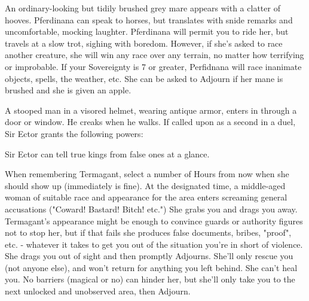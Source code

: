 
An ordinary-looking but tidily brushed grey mare appears with a clatter of hooves.  Pferdinana can speak to horses, but translates with snide remarks and uncomfortable, mocking laughter.  Pferdinana will permit you to ride her, but travels at a slow trot, sighing with boredom.  However, if she's asked to race another creature, she will win any race over any terrain, no matter how terrifying or improbable.  If your Sovereignty is 7 or greater, Perfidnana will race inanimate objects, spells, the weather, etc.  She can be asked to Adjourn if her mane is brushed and she is given an apple.


A stooped man in a visored helmet, wearing antique armor, enters in through a door or window.  He creaks when he walks.  If called upon as a second in a duel, Sir Ector grants the following powers:


Sir Ector can tell true kings from false ones at a glance.



When remembering Termagant, select a number of Hours from now when she should show up (immediately is fine).  At the designated time, a middle-aged woman of suitable race and appearance for the area enters screaming general accusations ("Coward!  Bastard!  Bitch!  etc.")  She grabs you and drags you away.  Termagant's appearance might be enough to convince guards or authority figures not to stop her, but if that fails she produces false documents, bribes, "proof", etc. - whatever it takes to get you out of the situation you're in short of violence.  She drags you out of sight and then promptly Adjourns.  She'll only rescue you (not anyone else), and won't return for anything you left behind.  She can't heal you.  No barriers (magical or no) can hinder her, but she'll only take you to the next unlocked and unobserved area, then Adjourn.


